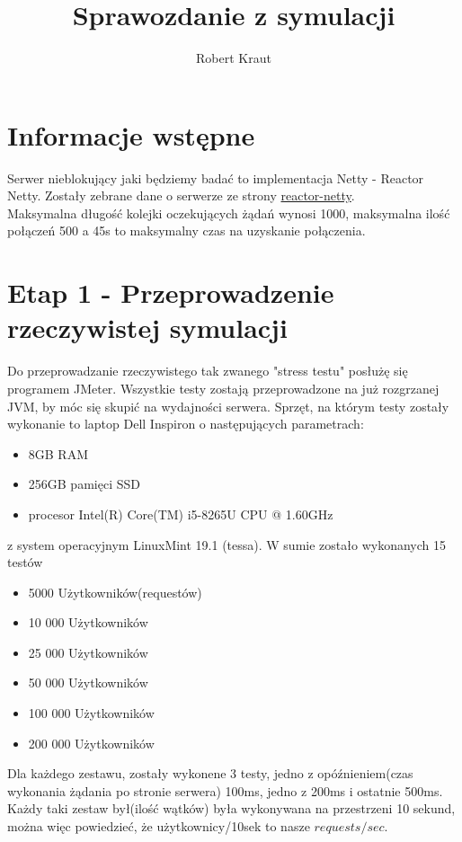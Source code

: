 \documentclass{article}
\title{Sprawozdanie z symulacji}
\author{Robert Kraut}
\begin{document}
    \maketitle


    \section{Informacje wstępne}
    Serwer nieblokujący jaki będziemy badać to implementacja Netty - Reactor Netty.
    Zostały zebrane dane o serwerze ze strony \href{https://projectreactor.io/docs/netty/release/reference/index.html}{reactor-netty}. \\
    Maksymalna długość kolejki oczekujących żądań wynosi 1000, maksymalna ilość połączeń 500 a 45s
    to maksymalny czas na uzyskanie połączenia.


    \section{Etap 1 - Przeprowadzenie rzeczywistej symulacji}
    Do przeprowadzanie rzeczywistego tak zwanego "stress testu" posłużę się programem JMeter. \newline
    Wszystkie testy zostają przeprowadzone na już rozgrzanej JVM, by móc się skupić na wydajności serwera. \newline
    Sprzęt, na którym testy zostały wykonanie to laptop Dell Inspiron o następujących parametrach:
    \begin{itemize}
        \item 8GB RAM
        \item 256GB pamięci SSD
        \item procesor Intel(R) Core(TM) i5-8265U CPU @ 1.60GHz
    \end{itemize} z system operacyjnym LinuxMint 19.1 (tessa). \newline
    W sumie zostało wykonanych 15 testów
    \begin{itemize}
        \item 5000 Użytkowników(requestów)
        \item 10 000 Użytkowników
        \item 25 000 Użytkowników
        \item 50 000 Użytkowników
        \item 100 000 Użytkowników
        \item 200 000 Użytkowników
    \end{itemize}
    Dla każdego zestawu, zostały wykonene 3 testy, jedno z opóźnieniem(czas wykonania żądania po stronie serwera) \newline
    100ms, jedno z 200ms i ostatnie 500ms.
    Każdy taki zestaw był(ilość wątków) była wykonywana na przestrzeni 10 sekund, można więc powiedzieć, że \newline
    użytkownicy/10sek to nasze \(requests/sec\).
\end{document}
